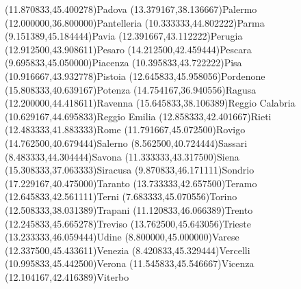 \mapputIIID[90](11.870833,45.400278){Padova}
\mapputIIID[90](13.379167,38.136667){Palermo}
\mapputIIID[90](12.000000,36.800000){Pantelleria}
\mapputIIID[90](10.333333,44.802222){Parma}
\mapputIIID[90](9.151389,45.184444){Pavia}
\mapputIIID[90](12.391667,43.112222){Perugia}
\mapputIIID[0](12.912500,43.908611){Pesaro}
\mapputIIID[90](14.212500,42.459444){Pescara}
\mapputIIID[90](9.695833,45.050000){Piacenza}
\mapputIIID[90](10.395833,43.722222){Pisa}
\mapputIIID[90](10.916667,43.932778){Pistoia}
\mapputIIID[90](12.645833,45.958056){Pordenone}
\mapputIIID[90](15.808333,40.639167){Potenza}
\mapputIIID[0](14.754167,36.940556){Ragusa}
\mapputIIID[90](12.200000,44.418611){Ravenna}
\mapputIIID[0](15.645833,38.106389){Reggio Calabria}
\mapputIIID[50](10.629167,44.695833){Reggio Emilia}
\mapputIIID[90](12.858333,42.401667){Rieti}
\mapputIIID[90](12.483333,41.883333){Rome}
\mapputIIID[90](11.791667,45.072500){Rovigo}
\mapputIIID[90](14.762500,40.679444){Salerno}
\mapputIIID[90](8.562500,40.724444){Sassari}
\mapputIIID[90](8.483333,44.304444){Savona}
\mapputIIID[90](11.333333,43.317500){Siena}
\mapputIIID[0](15.308333,37.063333){Siracusa}
\mapputIIID[90](9.870833,46.171111){Sondrio}
\mapputIIID[90](17.229167,40.475000){Taranto}
\mapputIIID[90](13.733333,42.657500){Teramo}
\mapputIIID[90](12.645833,42.561111){Terni}
\mapputIIID[90](7.683333,45.070556){Torino}
\mapputIIID[90](12.508333,38.031389){Trapani}
\mapputIIID[90](11.120833,46.066389){Trento}
\mapputIIID[90](12.245833,45.665278){Treviso}
\mapputIIID[90](13.762500,45.643056){Trieste}
\mapputIIID[90](13.233333,46.059444){Udine}
\mapputIIID[90](8.800000,45.000000){Varese}
\mapputIIID[0](12.337500,45.433611){Venezia}
\mapputIIID[90](8.420833,45.329444){Vercelli}
\mapputIIID[90](10.995833,45.442500){Verona}
\mapputIIID[90](11.545833,45.546667){Vicenza}
\mapputIIID[90](12.104167,42.416389){Viterbo}
\endinput 